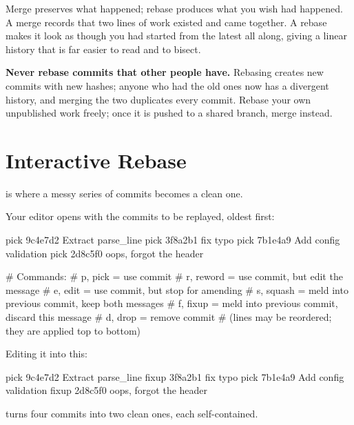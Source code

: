 \begin{intuition}
	Merge preserves what happened; rebase produces what you wish had happened. A
	merge records that two lines of work existed and came together. A rebase makes
	it look as though you had started from the latest  all along, giving
	a linear history that is far easier to read and to bisect.
\end{intuition}

\begin{moral}
	\textbf{Never rebase commits that other people have.} Rebasing creates new
	commits with new hashes; anyone who had the old ones now has a divergent
	history, and merging the two duplicates every commit. Rebase your own
	unpublished work freely; once it is pushed to a shared branch, merge instead.
\end{moral}

\section{Interactive Rebase}\label{sec:git-irebase}

 is where a messy series of commits becomes a clean one.


Your editor opens with the commits to be replayed, oldest first:

\begin{conf}
pick 9c4e7d2 Extract parse_line
pick 3f8a2b1 fix typo
pick 7b1e4a9 Add config validation
pick 2d8c5f0 oops, forgot the header

# Commands:
#  p, pick   = use commit
#  r, reword = use commit, but edit the message
#  e, edit   = use commit, but stop for amending
#  s, squash = meld into previous commit, keep both messages
#  f, fixup  = meld into previous commit, discard this message
#  d, drop   = remove commit
#  (lines may be reordered; they are applied top to bottom)
\end{conf}

Editing it into this:

\begin{conf}
pick 9c4e7d2 Extract parse_line
fixup 3f8a2b1 fix typo
pick 7b1e4a9 Add config validation
fixup 2d8c5f0 oops, forgot the header
\end{conf}

turns four commits into two clean ones, each self-contained.

